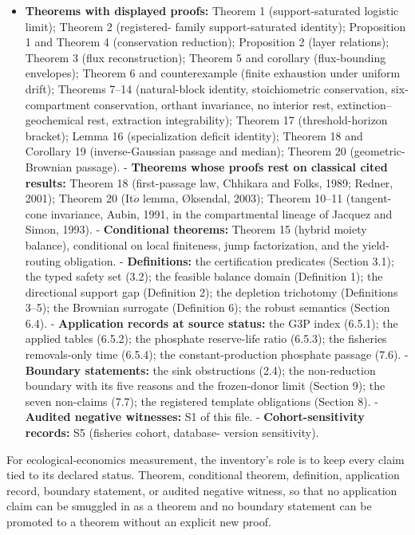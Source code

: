 \documentclass[11pt]{article}
\begin{document}
\begin{itemize}\setlength{\itemsep}{2pt}
\item \textbf{Theorems with displayed proofs:} Theorem 1 (support-saturated logistic limit); Theorem 2 (registered- family support-saturated identity); Proposition 1 and Theorem 4 (conservation reduction); Proposition 2 (layer relations); Theorem 3 (flux reconstruction); Theorem 5 and corollary (flux-bounding envelopes); Theorem 6 and counterexample (finite exhaustion under uniform drift); Theorems 7--14 (natural-block identity, stoichiometric conservation, six-compartment conservation, orthant invariance, no interior rest, extinction--geochemical rest, extraction integrability); Theorem 17 (threshold-horizon bracket); Lemma 16 (specialization deficit identity); Theorem 18 and Corollary 19 (inverse-Gaussian passage and median); Theorem 20 (geometric-Brownian passage). - \textbf{Theorems whose proofs rest on classical cited results:} Theorem 18 (first-passage law, Chhikara and Folks, 1989; Redner, 2001); Theorem 20 (It\(\ddot{o}\) lemma, \(\text{\O}\)ksendal, 2003); Theorem 10--11 (tangent-cone invariance, Aubin, 1991, in the compartmental lineage of Jacquez and Simon, 1993). - \textbf{Conditional theorems:} Theorem 15 (hybrid moiety balance), conditional on local finiteness, jump factorization, and the yield-routing obligation. - \textbf{Definitions:} the certification predicates (Section 3.1); the typed safety set (3.2); the feasible balance domain (Definition 1); the directional support gap (Definition 2); the depletion trichotomy (Definitions 3--5); the Brownian surrogate (Definition 6); the robust semantics (Section 6.4). - \textbf{Application records at source status:} the G3P index (6.5.1); the applied tables (6.5.2); the phosphate reserve-life ratio (6.5.3); the fisheries removals-only time (6.5.4); the constant-production phosphate passage (7.6). - \textbf{Boundary statements:} the sink obstructions (2.4); the non-reduction boundary with its five reasons and the frozen-donor limit (Section 9); the seven non-claims (7.7); the registered template obligations (Section 8). - \textbf{Audited negative witnesses:} S1 of this file. - \textbf{Cohort-sensitivity records:} S5 (fisheries cohort, database- version sensitivity).
\end{itemize}

For ecological-economics measurement, the inventory's role is to keep every claim tied to its declared status. Theorem, conditional theorem, definition, application record, boundary statement, or audited negative witness, so that no application claim can be smuggled in as a theorem and no boundary statement can be promoted to a theorem without an explicit new proof.
\end{document}
